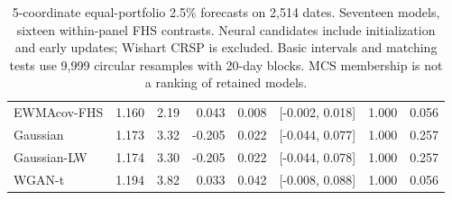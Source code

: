 \documentclass[11pt]{article}
\theoremstyle{definition}\newtheorem{definition}[theorem]{Definition}
\theoremstyle{remark}\newtheorem{remark}[theorem]{Remark}
\begin{document}
\begin{table}[htbp]
\begin{tabular}{lrrrrrrr}
EWMAcov-FHS & 1.160 & 2.19 & 0.043 & 0.008 & [-0.002, 0.018] & 1.000 & 0.056 \\
Gaussian & 1.173 & 3.32 & -0.205 & 0.022 & [-0.044, 0.077] & 1.000 & 0.257 \\
Gaussian-LW & 1.174 & 3.30 & -0.205 & 0.022 & [-0.044, 0.078] & 1.000 & 0.257 \\
WGAN-t & 1.194 & 3.82 & 0.033 & 0.042 & [-0.008, 0.088] & 1.000 & 0.056 \\
\bottomrule
\end{tabular}
\caption{5-coordinate equal-portfolio 2.5\% forecasts on 2,514 dates. Seventeen models, sixteen within-panel FHS contrasts. Neural candidates include initialization and early updates; Wishart CRSP is excluded. Basic intervals and matching tests use 9,999 circular resamples with 20-day blocks. MCS membership is not a ranking of retained models.}\label{tab:r4-crsp5-secondary}
\end{table}
\end{document}
